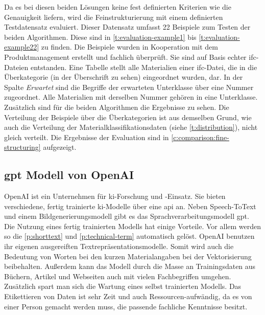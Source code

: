 Da es bei diesen beiden Lösungen keine fest definierten Kriterien wie die Genauigkeit liefern, wird die Feinstrukturierung mit einem definierten Testdatensatz evaluiert. Dieser Datensatz umfasst 22 Beispiele zum Testen der beiden Algorithmen. Diese sind in \autoref{t:evaluation-example1} bis \autoref{t:evaluation-example22} zu finden. Die Beispiele wurden in Kooperation mit dem Produktmanagement erstellt und fachlich überprüft. Sie sind auf Basis echter \ac{ifc}-Dateien entstanden. Eine Tabelle stellt alle Materialien einer \ac{ifc}-Datei, die in die Überkategorie (in der Überschrift zu sehen) eingeordnet wurden, dar. In der Spalte \textit{Erwartet} sind die Begriffe der erwarteten Unterklasse über eine Nummer zugeordnet. Alle Materialien mit derselben Nummer gehören in eine Unterklasse. Zusätzlich sind für die beiden Algorithmen die Ergebnisse zu sehen. Die Verteilung der Beispiele über die Überkategorien ist aus demselben Grund, wie auch die Verteilung der Materialklassifikationsdaten (siehe \autoref{t:distribution}), nicht gleich verteilt. Die Ergebnisse der Evaluation sind in \autoref{c:comparison:fine-structuring} aufgezeigt.



\subsection{\acf{gpt} Modell von OpenAI}
\label{c:conception:fine-structuring:openai}
OpenAI ist ein Unternehmen für \ac{ki}-Forschung und -Einsatz. Sie bieten verschiedene, fertig trainierte \ac{ki}-Modelle über eine \ac{api} an. Neben Speech-ToText und einem Bildgenerierungsmodell gibt es das Sprachverarbeitungsmodell \ac{gpt}. \citep[vgl.][]{openai_company}
Die Nutzung eines fertig trainierten Modells hat einige Vorteile. Vor allem werden so die \autoref{p:shorttext} und \autoref{p:technical-term} automatisch gelöst. OpenAI benutzen ihr eigenen ausgereiften Textrepräsentationsmodelle. Somit wird auch die Bedeutung von Worten bei den kurzen Materialangaben bei der Vektorisierung beibehalten. Außerdem kann das Modell durch die Masse an Trainingsdaten aus Büchern, Artikel und Webseiten auch mit vielen Fachbegriffen umgehen. Zusätzlich spart man sich die Wartung eines selbst trainierten Modells. Das Etikettieren von Daten ist sehr Zeit und auch Ressourcen-aufwändig, da es von einer Person gemacht werden muss, die passende fachliche Kenntnisse besitzt.

